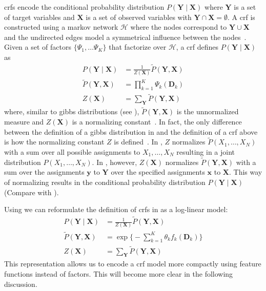 \bigskip

\Glspl{crf} encode the \gls{conditional probability distribution} $P(\bm{Y}\mid\bm{X})$ where $\bm{Y}$ is a set of \glspl{target variable} and $\bm{X}$ is a set of \glspl{observed variable} with $\bm{Y}\cap\bm{X}=\emptyset$.
A \gls{crf} is constructed using a \gls{markov network} $\mathcal{H}$ where the nodes correspond to $\bm{Y}\cup\bm{X}$ and the undirected edges model a symmetrical influence between the nodes~\citep{koller2009probabilistic}.
Given a set of \glspl{factor} $\{\Psi_1,\dots\Psi_K\}$ that factorize over $\mathcal{H}$, a \gls{crf} defines $P(\bm{Y}\mid\bm{X})$ as~\citep{koller2009probabilistic}
\begin{equation}
  \label{equ:crf-factor}
  \begin{split}
    P(\bm{Y}\mid\bm{X}) & = \frac{1}{Z(\bm{X})}\tilde{P}(\bm{Y},\bm{X}) \\
    \tilde{P}(\bm{Y},\bm{X}) &= \prod_{k=1}^{K}\Psi_k(\bm{D}_k) \\
    Z(\bm{X}) & = \sum_{\bm{Y}}\tilde{P}(\bm{Y},\bm{X})
  \end{split}
\end{equation}
where, similar to \glspl{gibbs distribution} (see ), $\tilde{P}(\bm{Y},\bm{X})$ is the unnormalized measure and $Z(\bm{X})$ is a normalizing constant~\citep{koller2009probabilistic}.
In fact, the only difference between the definition of a \gls{gibbs distribution} in  and the definition of a \gls{crf} above is how the normalizing constant $Z$ is defined~\citep{koller2009probabilistic}.
In , $Z$ normalizes $\tilde{P}(X_1,\dots,X_N)$ with a sum over all possible assignments to $X_1,\dots,X_N$ resulting in a \gls{joint distribution} $P(X_1,\dots,X_N)$.
In , however, $Z(\bm{X})$ normalizes $\tilde{P}(\bm{Y},\bm{X})$ with a sum over the assignments $\bm{y}$ to $\bm{Y}$ over the specified assignments $\bm{x}$ to $\bm{X}$.
This way of normalizing results in the \gls{conditional probability distribution} $P(\bm{Y}\mid\bm{X})$ (Compare with ).

\bigskip

Using  we can reformulate the definition of \glspl{crf} in  as a \gls{log-linear model}:
\begin{equation}
  \label{equ:crf-log-linear}
  \begin{split}
    P(\bm{Y}\mid\bm{X}) & = \frac{1}{Z(\bm{X})}\tilde{P}(\bm{Y},\bm{X}) \\
    \tilde{P}(\bm{Y},\bm{X}) & = \exp\Bigg\{ -\sum_{k=1}^K \theta_k f_k(\bm{D}_k)\Bigg\} \\
    Z(\bm{X}) & = \sum_{\bm{Y}}\tilde{P}(\bm{Y},\bm{X})
  \end{split}
\end{equation}
This representation allows us to encode a \gls{crf} model more compactly using \glspl{feature function} instead of \glspl{factor}.
This will become more clear in the following discussion.


